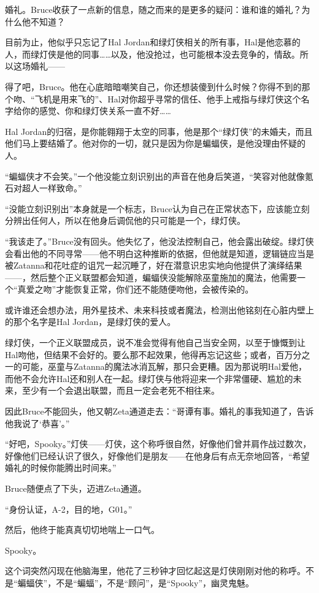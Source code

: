 \documentclass[../main.tex]{subfiles}
\begin{document}
婚礼。Bruce收获了一点新的信息，随之而来的是更多的疑问：谁和谁的婚礼？为什么他不知道？

目前为止，他似乎只忘记了Hal
Jordan和绿灯侠相关的所有事，Hal是他恋慕的人，而绿灯侠是他的同事\ldots\ldots 以及，他没抢过，也可能根本没去竞争的，情敌。所以这场婚礼——

得了吧，Bruce。他在心底暗暗嘲笑自己，你还想装傻到什么时候？你得不到的那个吻、“飞机是用来飞的”、Hal对你超乎寻常的信任、他手上戒指与绿灯侠这个名字给你的感觉、你和绿灯侠关系一直不好\ldots\ldots{}

Hal
Jordan的归宿，是你能翱翔于太空的同事，他是那个“绿灯侠”的未婚夫，而且他们马上要结婚了。他对你的一切，就只是因为你是蝙蝠侠，是他没理由怀疑的人。

“蝙蝠侠才不会笑。”一个他没能立刻识别出的声音在他身后笑道，“笑容对他就像氪石对超人一样致命。”

“没能立刻识别出”本身就是一个标志，Bruce认为自己在正常状态下，应该能立刻分辨出任何人，所以在他身后调侃他的只可能是一个，绿灯侠。

“我该走了。”Bruce没有回头。他失忆了，他没法控制自己，他会露出破绽。绿灯侠会看出他的不同寻常——他不明白这种推断的依据，但他就是知道，逻辑链应当是被Zatanna和花吐症的诅咒一起沉睡了，好在潜意识忠实地向他提供了演绎结果——，然后整个正义联盟都会知道，蝙蝠侠没能解除巫童施加的魔法，他需要一个“真爱之吻”才能恢复正常，你们还不能随便吻他，会被传染的。

或许谁还会想办法，用外星技术、未来科技或者魔法，检测出他铭刻在心脏内壁上的那个名字是Hal
Jordan，是绿灯侠的爱人。

绿灯侠，一个正义联盟成员，说不准会觉得有他自己当安全网，以至于慷慨到让Hal吻他，但结果不会好的。要么那不起效果，他得再忘记这些；或者，百万分之一的可能，巫童与Zatanna的魔法冰消瓦解，那只会更糟。因为那说明Hal爱他，而他不会允许Hal还和别人在一起。绿灯侠与他将迎来一个非常僵硬、尴尬的未来，至少有一个会退出联盟，而且一定会老死不相往来。

因此Bruce不能回头，他又朝Zeta通道走去：“哥谭有事。婚礼的事我知道了，告诉他我说了`恭喜'。”

“好吧，Spooky。”灯侠——灯侠，这个称呼很自然，好像他们曾并肩作战过数次，好像他们已经认识了很久，好像他们是朋友——在他身后有点无奈地回答，“希望婚礼的时候你能腾出时间来。”

Bruce随便点了下头，迈进Zeta通道。

“身份认证，A-2，目的地，G01。”

然后，他终于能真真切切地喘上一口气。

Spooky。

这个词突然闪现在他脑海里，他花了三秒钟才回忆起这是灯侠刚刚对他的称呼。不是“蝙蝠侠”，不是“蝙蝠”，不是“顾问”，是“Spooky”，幽灵鬼魅。
\end{document}
